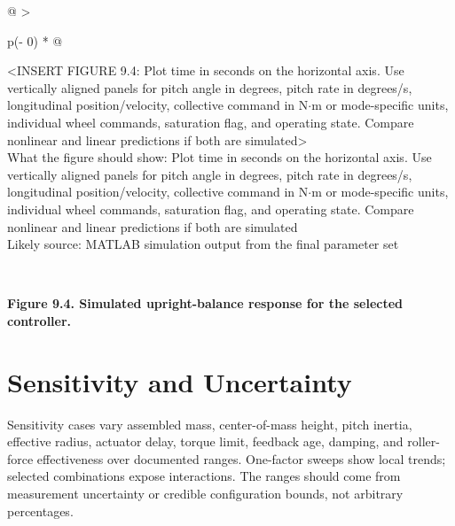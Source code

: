 \begin{longtable}[]{@{}
  >{\raggedright\arraybackslash}p{(\columnwidth - 0\tabcolsep) * }@{}}
\toprule\noalign{}
\begin{minipage}[b]{\linewidth}\raggedright
\textless INSERT FIGURE 9.4: Plot time in seconds on the horizontal
axis. Use vertically aligned panels for pitch angle in degrees, pitch
rate in degrees\slash{}s, longitudinal position\slash{}velocity, collective command in
N\ensuremath{\cdot}m or mode-specific units, individual wheel commands, saturation flag,
and operating state. Compare nonlinear and linear predictions if both
are simulated\textgreater{}\\
What the figure should show: Plot time in seconds on the horizontal
axis. Use vertically aligned panels for pitch angle in degrees, pitch
rate in degrees\slash{}s, longitudinal position\slash{}velocity, collective command in
N\ensuremath{\cdot}m or mode-specific units, individual wheel commands, saturation flag,
and operating state. Compare nonlinear and linear predictions if both
are simulated\\
Likely source: MATLAB simulation output from the final parameter
set\strut
\end{minipage} \\
\midrule\noalign{}
\endhead
\bottomrule\noalign{}
\endlastfoot
\end{longtable}

\begin{center}\singlespacing
{}
\textbf{Figure 9.4. Simulated upright-balance response for the selected controller.}
\end{center}

\section{Sensitivity and Uncertainty}\label{sensitivity-and-uncertainty}

Sensitivity cases vary assembled mass, center-of-mass height, pitch
inertia, effective radius, actuator delay, torque limit, feedback age,
damping, and roller-force effectiveness over documented ranges.
One-factor sweeps show local trends; selected combinations expose
interactions. The ranges should come from measurement uncertainty or
credible configuration bounds, not arbitrary percentages.

